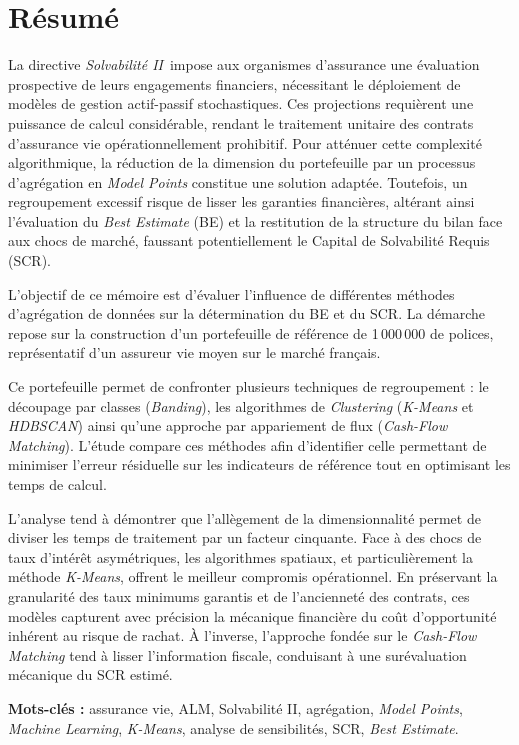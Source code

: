 \chapter*{Résumé}

La directive \textit{Solvabilité II}\ impose aux organismes d'assurance une évaluation prospective de leurs engagements financiers, nécessitant le déploiement de modèles de gestion actif-passif stochastiques. Ces projections requièrent une puissance de calcul considérable, rendant le traitement unitaire des contrats d'assurance vie opérationnellement prohibitif. Pour atténuer cette complexité algorithmique, la réduction de la dimension du portefeuille par un processus d'agrégation en \textit{Model Points} constitue une solution adaptée. Toutefois, un regroupement excessif risque de lisser les garanties financières, altérant ainsi l'évaluation du \textit{Best Estimate} (BE) et la restitution de la structure du bilan face aux chocs de marché, faussant potentiellement le Capital de Solvabilité Requis (SCR).

L'objectif de ce mémoire est d'évaluer l'influence de différentes méthodes d'agrégation de données sur la détermination du BE et du SCR. La démarche repose sur la construction d'un portefeuille de référence de 1\,000\,000 de polices, représentatif d'un assureur vie moyen sur le marché français.

Ce portefeuille permet de confronter plusieurs techniques de regroupement : le découpage par classes (\textit{Banding}), les algorithmes de \textit{Clustering} (\textit{K-Means} et \textit{HDBSCAN}) ainsi qu'une approche par appariement de flux (\textit{Cash-Flow Matching}). L'étude compare ces méthodes afin d'identifier celle permettant de minimiser l'erreur résiduelle sur les indicateurs de référence tout en optimisant les temps de calcul.

L'analyse tend à démontrer que l'allègement de la dimensionnalité permet de diviser les temps de traitement par un facteur cinquante. Face à des chocs de taux d'intérêt asymétriques, les algorithmes spatiaux, et particulièrement la méthode \textit{K-Means}, offrent le meilleur compromis opérationnel. En préservant la granularité des taux minimums garantis et de l'ancienneté des contrats, ces modèles capturent avec précision la mécanique financière du coût d'opportunité inhérent au risque de rachat. À l'inverse, l'approche fondée sur le \textit{Cash-Flow Matching} tend à lisser l'information fiscale, conduisant à une surévaluation mécanique du SCR estimé.

\vspace{0.5cm}
\noindent \textbf{Mots-clés :} assurance vie, ALM, Solvabilité II, agrégation, \textit{Model Points}, \textit{Machine Learning}, \textit{K-Means}, analyse de sensibilités, SCR, \textit{Best Estimate}.